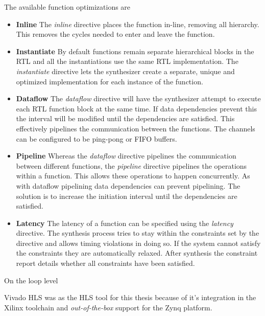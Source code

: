 The available function optimizations are

\begin{itemize}
	\item 	\textbf{Inline} The \emph{inline} directive places the function in-line, removing all hierarchy. This removes the cycles needed to enter and leave the function.
	\item 	\textbf{Instantiate}  By default functions remain separate hierarchical blocks in the RTL and all the instantiations use the same RTL implementation. The \emph{instantiate} directive lets the synthesizer create a separate,
	unique and optimized implementation for each instance of the function. 
	\item 	\textbf{Dataflow} The \emph{dataflow} directive will have the synthesizer attempt to execute each RTL function block at the same time. If data dependencies prevent this the interval will be modified until the dependencies are satisfied. This effectively pipelines the communication between the functions. The channels can be configured to be ping-pong or FIFO buffers. 
	\item 	\textbf{Pipeline} Whereas the \emph{dataflow} directive pipelines the communication between different functions, the \emph{pipeline} directive pipelines the operations within a function. This allows these operations to happen concurrently. As with dataflow pipelining data dependencies can prevent pipelining. The solution is to increase the initiation interval until the dependencies are satisfied.
	\item 	\textbf{Latency} The latency of a function can be specified using the \emph{latency} directive. The synthesis process tries to stay within the constraints set by the directive and allows timing violations in doing so. If the system cannot satisfy the constraints they are automatically relaxed. After synthesis the constraint report details whether all constraints have been satisfied.
\end{itemize}

On the loop level 

Vivado HLS was as the HLS tool for this thesis because of it's integration in the Xilinx toolchain and \emph{out-of-the-box} support for the Zynq platform. 

